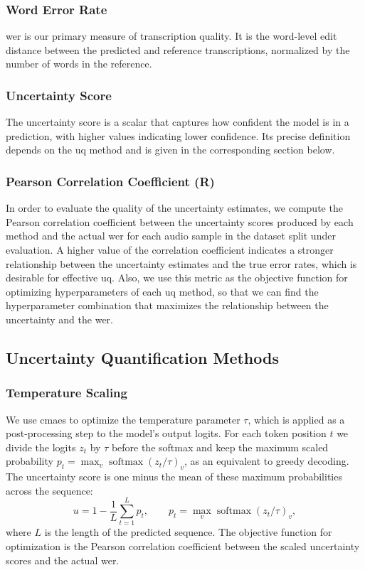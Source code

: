 \documentclass[runningheads]{llncs}
\begin{document}
\subsubsection{Word Error Rate}
\acrshort{wer} is our primary measure of transcription quality. It is the word-level edit distance between the predicted and reference transcriptions, normalized by the number of words in the reference.

\subsubsection{Uncertainty Score}
The uncertainty score is a scalar that captures how confident the model is in a prediction, with higher values indicating lower confidence. Its precise definition depends on the \acrshort{uq} method and is given in the corresponding section below.

\subsubsection{Pearson Correlation Coefficient (R)}
In order to evaluate the quality of the uncertainty estimates, we compute the Pearson correlation coefficient between the uncertainty scores produced by each method and the actual \acrshort{wer} for each audio sample in the dataset split under evaluation. A higher value of the correlation coefficient indicates a stronger relationship between the uncertainty estimates and the true error rates, which is desirable for effective \acrshort{uq}.
Also, we use this metric as the objective function for optimizing hyperparameters of each \acrshort{uq} method, so that we can find the hyperparameter combination that maximizes the relationship between the uncertainty and the \acrshort{wer}.

\subsection{Uncertainty Quantification Methods}

\subsubsection{Temperature Scaling}
We use \acrshort{cmaes} to optimize the temperature parameter $\tau$, which is applied as a post-processing step to the model's output logits. For each token position $t$ we divide the logits $z_t$ by $\tau$ before the softmax and keep the maximum scaled probability $p_t = \max_v \operatorname{softmax}(z_t / \tau)_v$, as an equivalent to greedy decoding. The uncertainty score is one minus the mean of these maximum probabilities across the sequence:
\begin{equation}
    u = 1 - \frac{1}{L}\sum_{t=1}^{L} p_t,
    \qquad p_t = \max_v \operatorname{softmax}(z_t / \tau)_v,
\end{equation}
where $L$ is the length of the predicted sequence. The objective function for optimization is the Pearson correlation coefficient between the scaled uncertainty scores and the actual \acrshort{wer}.
\end{document}
